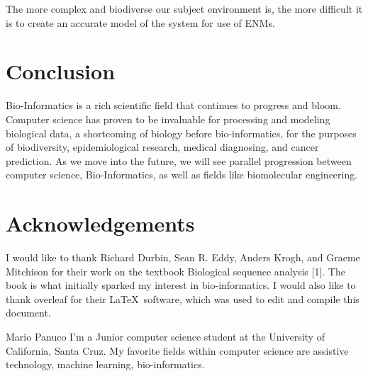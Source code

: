 \documentclass[12pt,journal,compsoc]{IEEEtran}
\begin{document}
The more complex and biodiverse our subject environment is, the more difficult it is to create an accurate model of the system for use of ENMs.

\section{Conclusion}
Bio-Informatics is a rich scientific field that continues to progress and bloom. Computer science has proven to be invaluable for processing and modeling biological data, a shortcoming of biology before bio-informatics, for the purposes of biodiversity, epidemiological research, medical diagnosing, and cancer prediction. As we move into the future, we will see parallel progression between computer science, Bio-Informatics, as well as fields like biomolecular engineering.

\section*{Acknowledgements}
\label{Textbook}
I would like to thank Richard Durbin, Sean R. Eddy, Anders Krogh, and Graeme Mitchison for their work on the textbook Biological sequence analysis [1]. The book is what initially sparked my interest in bio-informatics.
I would also like to thank overleaf for their \LaTeX\ software, which was used to edit and compile this document.





 
\vfill
\begin{IEEEbiography}{Mario Panuco}
I'm a Junior computer science student at the University of California, Santa Cruz. My favorite fields within computer science are assistive technology, machine learning, bio-informatics.
\end{IEEEbiography}
\end{document}
